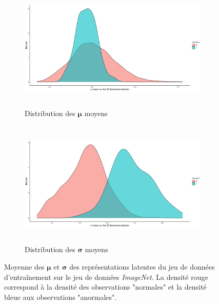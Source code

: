 \begin{figure}[H]
	\centering
	\begin{subfigure}{12cm}
		\centering\includegraphics[width=12cm, height=6cm]{images/latent_stats/plot_mu}
		\caption{Distribution des $\boldsymbol{\mu}$ moyens}
	\end{subfigure}
	\begin{subfigure}{12cm}
		\centering\includegraphics[width=12cm, height=6cm]{images/latent_stats/plot_sigma}
		\caption{Distribution des $\boldsymbol{\sigma}$ moyens}
	\end{subfigure}
	\DIFdelbeginFL %
\DIFdelendFL \DIFaddbeginFL \caption[Moyenne des $\boldsymbol{\mu}$ et $\boldsymbol{\sigma}$ des représentations latentes du jeu de données d'entraînement sur le jeu de données \textit{ImageNet}.]{\DIFaddendFL Moyenne des $\boldsymbol{\mu}$ et $\boldsymbol{\sigma}$ des représentations latentes du jeu de données d'entraînement sur le jeu de données \textit{ImageNet}. La densité rouge correspond à la densité des observations "normales" et la densité bleue aux observations "anormales".}
	\label{fig:cars_latent_stats}
\end{figure}

